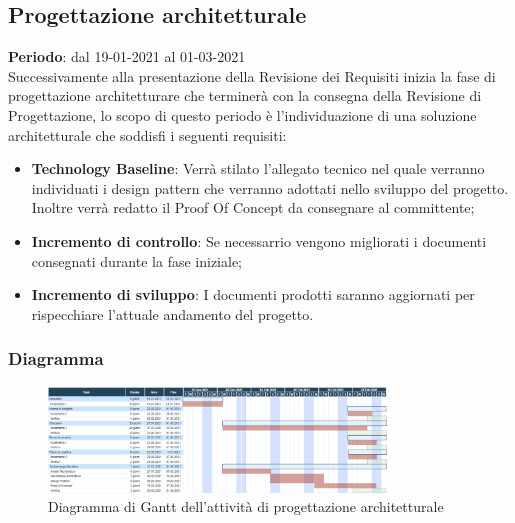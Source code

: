 	\subsection{Progettazione architetturale}
	\textbf{Periodo}: dal 19-01-2021 al 01-03-2021 \\
	Successivamente alla presentazione della Revisione dei Requisiti inizia la fase di progettazione architetturare che terminerà con la consegna della Revisione di Progettazione, lo scopo di questo periodo è l'individuazione di una soluzione architetturale che soddisfi i seguenti requisiti:
	\begin{itemize}
		\item \textbf{Technology Baseline}: Verrà stilato l'allegato tecnico nel quale verranno individuati i design pattern che verranno adottati nello sviluppo del progetto. Inoltre verrà redatto il Proof Of Concept da consegnare al committente;
		\item \textbf{Incremento di controllo}: Se necessarrio vengono migliorati i documenti consegnati durante la fase iniziale;
		\item \textbf{Incremento di sviluppo}: I documenti prodotti saranno aggiornati per rispecchiare l'attuale andamento del progetto.
	\end{itemize}
	
	\subsubsection{Diagramma}
		\begin{figure}[H]
        		\centering
        		\includegraphics[width=0.8\textwidth]{source/img/Progettazione_architetturale.png}
        		\caption{Diagramma di Gantt dell'attività di progettazione architetturale}
    		\end{figure}
